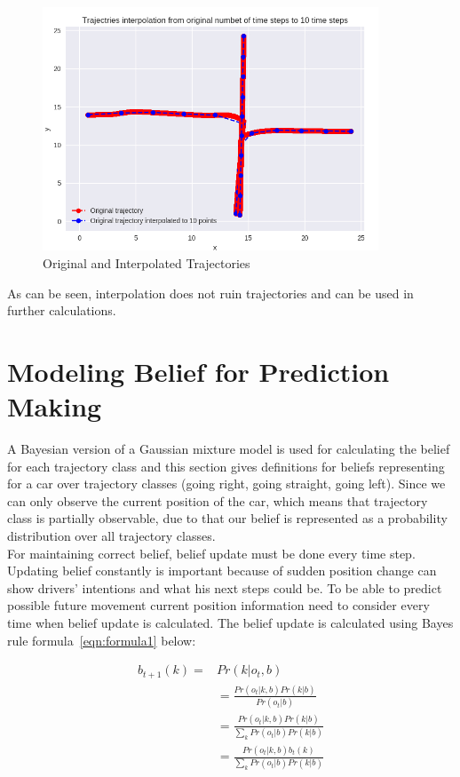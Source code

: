 \begin{figure}[h]
	\centering  	
	\includegraphics[width=10cm]{img/interpolation_example.jpg}
	\caption{Original and Interpolated Trajectories}
	\label{fig:InterExam}    
\end{figure}

As can be seen, interpolation does not ruin trajectories and can be used in further calculations.

\section{Modeling Belief for Prediction Making}

A Bayesian version of a Gaussian mixture model is used for calculating the belief for each trajectory class and this section gives definitions for beliefs representing for a car over trajectory classes (going right, going straight, going left). Since we can only observe the current position of the car, which means that trajectory class is partially observable, due to that our belief is represented as a probability distribution over all trajectory classes. \\
For maintaining correct belief, belief update must be done every time step. Updating belief constantly is important because of sudden position change can show drivers' intentions and what his next steps could be. To be able to predict possible future movement current position information need to consider every time when belief update is calculated. The belief update is calculated using Bayes rule formula~\ref{eqn:formula1} below: 

\begin{equation}
\begin{split}
b_{t+1}(k) = & \displaystyle Pr(k|o_{t}, b) \\ 
& = \displaystyle \frac{Pr(o_{t}|k, b) Pr(k|b)}{Pr(o_{t}|b)} \\
& = \displaystyle \frac{Pr(o_{t}|k, b) Pr(k|b)}{ \sum_{k} Pr(o_{t}|b) Pr(k|b)} \\
& = \displaystyle \frac{Pr(o_{t}|k, b) b_{t}(k)}{ \sum_{k} Pr(o_{t}|b) Pr(k|b)}
\end{split}
\label{eqn:formula1}
\end{equation}

